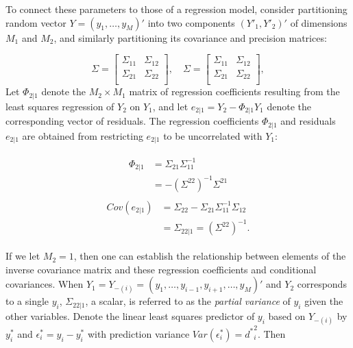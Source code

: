 \documentclass[../chapter-1-introduction.tex]{subfiles}
\begin{document}
To connect these parameters to those of a regression model, consider partitioning random vector $Y = \left(y_1,\dots, y_M\right)'$ into two components $\left(Y'_1,Y'_2\right)'$ of dimensions $M_1$ and $M_2$, and similarly partitioning its covariance and precision matrices:

\begin{equation} \label{eq:partitioned-covariance-matrix}
\Sigma = \begin{bmatrix} \Sigma_{11} & \Sigma_{12} \\ \Sigma_{21} & \Sigma_{22} \\  
\end{bmatrix}, \quad \Sigma = \begin{bmatrix} \Sigma_{11} & \Sigma_{12} \\ \Sigma_{21} & \Sigma_{22} \\  
\end{bmatrix},
\end{equation}
\noindent
Let $\Phi_{2\vert 1}$ denote the $M_2 \times M_1$ matrix of regression coefficients resulting from the least squares regression of $Y_2$ on $Y_1$, and let $e_{2\vert 1} = Y_2 - \Phi_{2\vert 1} Y_1$ denote the corresponding vector of residuals. The regression coefficients $\Phi_{2\vert 1}$ and residuals $e_{2\vert 1}$ are obtained from restricting $e_{2\vert 1}$ to be uncorrelated with $Y_1$:

\begin{align}
 \begin{split} \label{eq:conditional-coef-y2-given-y1}
 \Phi_{2\vert 1} &= \Sigma_{21}  \Sigma_{11}^{-1}  \\
 &= -\left( \Sigma^{22}\right)^{-1} \Sigma^{21} 
 \end{split}
 \end{align}
\begin{align}
 \begin{split} \label{eq:conditional-cov-y2-given-y1}
Cov\left(e_{2\vert 1}\right) &=  \Sigma_{22} - \Sigma_{21}\Sigma_{11}^{-1}\Sigma_{12}\\
&=  \Sigma_{22\vert 1}  = \left(\Sigma^{22} \right)^{-1}. 
 \end{split}
\end{align}

If we let $M_2 = 1$, then one can establish the relationship between elements of the inverse covariance matrix and these regression coefficients and conditional covariances. When $Y_1 = Y_{-\left(i\right)} = \left( y_1, \dots, y_{i-1}, y_{i+1},\dots, y_M \right)'$ and $Y_2$ corresponds to a single $y_i$, $\Sigma_{22\vert 1}$, a scalar, is referred to as the \textit{partial variance} of $y_i$ given the other variables.  Denote the linear least squares predictor of $y_i$ based on $Y_{-\left(i\right)}$ by $y^*_i$ and $\epsilon^*_i = y_i - y^*_i$ with prediction variance $Var\left(\epsilon^*_i \right) = {d^*}^2_i$. Then
\end{document}
